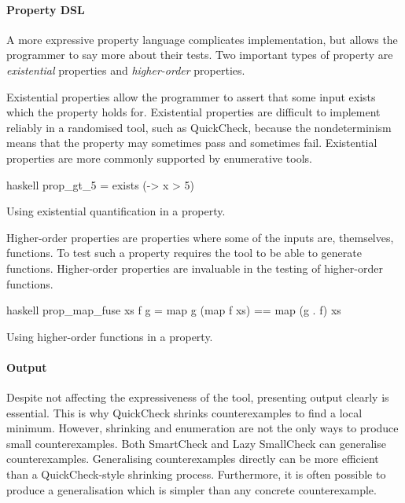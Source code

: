 \paragraph{Property DSL}
A more expressive property language complicates implementation, but
allows the programmer to say more about their tests.  Two important
types of property are \emph{existential} properties and
\emph{higher-order} properties.

Existential properties allow the programmer to assert that some input
exists which the property holds for.  Existential properties are
difficult to implement reliably in a randomised tool, such as
QuickCheck, because the nondeterminism means that the property may
sometimes pass and sometimes fail.  Existential properties are more
commonly supported by enumerative tools.

\begin{listing}
\centering
\begin{cminted}{haskell}
prop_gt_5 = exists (\x -> x > 5)
\end{cminted}
\caption{Using existential quantification in a property.}\label{lst:prop_gt_5}
\end{listing}

Higher-order properties are properties where some of the inputs are,
themselves, functions.  To test such a property requires the tool to
be able to generate functions.  Higher-order properties are invaluable
in the testing of higher-order functions.

\begin{listing}
\centering
\begin{cminted}{haskell}
prop_map_fuse xs f g = map g (map f xs) == map (g . f) xs
\end{cminted}
\caption{Using higher-order functions in a property.}\label{lst:prop_map_fuse}
\end{listing}

\paragraph{Output}
Despite not affecting the expressiveness of the tool, presenting
output clearly is essential.  This is why
QuickCheck\cite{claessen2000} shrinks counterexamples to find a local
minimum.  However, shrinking and enumeration are not the only ways to
produce small counterexamples.  Both SmartCheck\cite{pike2014} and
Lazy SmallCheck\cite{runciman2008} can generalise counter\-examples.
Generalising counterexamples directly can be more efficient than a
QuickCheck-style shrinking process\cite{pike2014}.  Furthermore, it is
often possible to produce a generalisation which is simpler than any
concrete counterexample.


